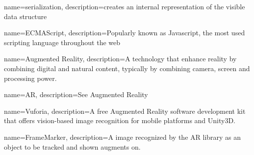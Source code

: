 {
	name=serialization,
	description={creates an internal representation of the visible data 
  				structure}
}

{
	name=ECMAScript,
	description={Popularly known as Javascript, the most used scripting
				language throughout the web}
}

{
	name=Augmented Reality,
	description={A technology that enhance reality by combining digital and
				natural content, typically by combining camera, screen and
				processing power.}
}

{
	name=AR,
	description={See \gls{Augmented Reality}}
}

{
	name=Vuforia,
	description={A free Augmented Reality software development kit that	offers
				vision-based image recognition for mobile platforms	and 
				Unity3D.}
}

{
	name=FrameMarker,
	description={A image recognized by the AR library as an object to be tracked and shown augments on.}
}